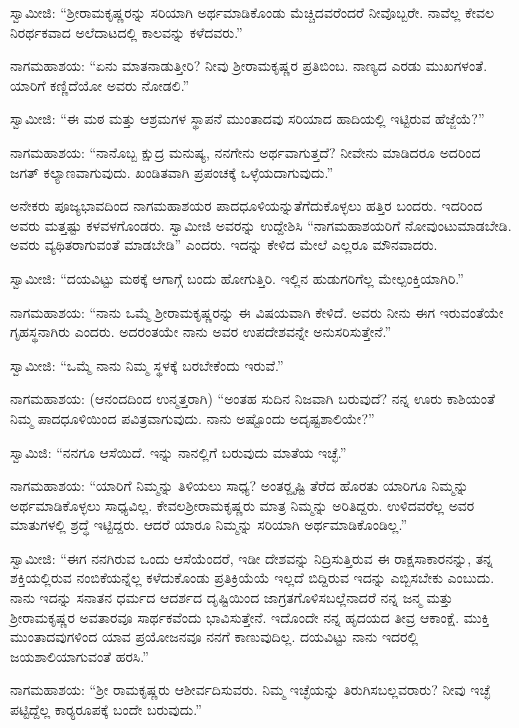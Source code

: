  ಸ್ವಾಮೀಜಿ: “ಶ‍್ರೀರಾಮಕೃಷ್ಣರನ್ನು ಸರಿಯಾಗಿ ಅರ್ಥಮಾಡಿಕೊಂಡು ಮೆಚ್ಚಿದವರೆಂದರೆ ನೀವೊಬ್ಬರೇ. ನಾವೆಲ್ಲ ಕೇವಲ ನಿರರ್ಥಕವಾದ ಅಲೆದಾಟದಲ್ಲಿ ಕಾಲವನ್ನು ಕಳೆದವರು.” 

 ನಾಗಮಹಾಶಯ: “ಏನು ಮಾತನಾಡುತ್ತೀರಿ? ನೀವು ಶ‍್ರೀರಾಮಕೃಷ್ಣರ ಪ್ರತಿಬಿಂಬ. ನಾಣ್ಯದ ಎರಡು ಮುಖಗಳಂತೆ. ಯಾರಿಗೆ ಕಣ್ಣಿದೆಯೋ ಅವರು ನೋಡಲಿ.” 

 ಸ್ವಾಮೀಜಿ: “ಈ ಮಠ ಮತ್ತು ಆಶ್ರಮಗಳ ಸ್ಥಾಪನೆ ಮುಂತಾದವು ಸರಿಯಾದ ಹಾದಿಯಲ್ಲಿ ಇಟ್ಟಿರುವ ಹೆಜ್ಜೆಯೆ?” 

\newpage

 ನಾಗಮಹಾಶಯ: “ನಾನೊಬ್ಬ ಕ್ಷುದ್ರ ಮನುಷ್ಯ, ನನಗೇನು ಅರ್ಥವಾಗುತ್ತದೆ? ನೀವೇನು ಮಾಡಿದರೂ ಅದರಿಂದ ಜಗತ್ ಕಲ್ಯಾಣವಾಗುವುದು. ಖಂಡಿತವಾಗಿ ಪ್ರಪಂಚಕ್ಕೆ ಒಳ್ಳೆಯದಾಗುವುದು.” 

 ಅನೇಕರು ಪೂಜ್ಯಭಾವದಿಂದ ನಾಗಮಹಾಶಯರ ಪಾದಧೂಳಿಯನ್ನು\break ತೆಗೆದುಕೊಳ್ಳಲು ಹತ್ತಿರ ಬಂದರು. ಇದರಿಂದ ಅವರು ಮತ್ತಷ್ಟು ಕಳವಳಗೊಂಡರು. ಸ್ವಾಮೀಜಿ ಅವರನ್ನು ಉದ್ದೇಶಿಸಿ “ನಾಗಮಹಾಶಯರಿಗೆ ನೋವುಂಟುಮಾಡಬೇಡಿ. ಅವರು ವ್ಯಥಿತರಾಗುವಂತೆ ಮಾಡಬೇಡಿ” ಎಂದರು. ಇದನ್ನು ಕೇಳಿದ ಮೇಲೆ ಎಲ್ಲರೂ ಮೌನವಾದರು. 

 ಸ್ವಾಮೀಜಿ: “ದಯವಿಟ್ಟು ಮಠಕ್ಕೆ ಆಗಾಗ್ಗೆ ಬಂದು ಹೋಗುತ್ತಿರಿ. ಇಲ್ಲಿನ ಹುಡುಗರಿಗೆಲ್ಲ ಮೇಲ್ಪಂಕ್ತಿಯಾಗಿರಿ.” 

 ನಾಗಮಹಾಶಯ: “ನಾನು ಒಮ್ಮೆ ಶ‍್ರೀರಾಮಕೃಷ್ಣರನ್ನು ಈ ವಿಷಯವಾಗಿ ಕೇಳಿದೆ. ಅವರು ನೀನು ಈಗ ಇರುವಂತೆಯೇ ಗೃಹಸ್ಥನಾಗಿರು ಎಂದರು. ಅದರಂತಯೇ ನಾನು ಅವರ ಉಪದೇಶವನ್ನೇ ಅನುಸರಿಸುತ್ತೇನೆ.” 

 ಸ್ವಾಮೀಜಿ: “ಒಮ್ಮೆ ನಾನು ನಿಮ್ಮ ಸ್ಥಳಕ್ಕೆ ಬರಬೇಕೆಂದು ಇರುವೆ.” 

 ನಾಗಮಹಾಶಯ: (ಆನಂದದಿಂದ ಉನ್ಮತ್ತರಾಗಿ) “ಅಂತಹ ಸುದಿನ ನಿಜವಾಗಿ ಬರುವುದೆ? ನನ್ನ ಊರು ಕಾಶಿಯಂತೆ ನಿಮ್ಮ ಪಾದಧೂಳಿಯಿಂದ ಪವಿತ್ರವಾಗುವುದು. ನಾನು ಅಷ್ಟೊಂದು ಅದೃಷ್ಟಶಾಲಿಯೇ?” 

 ಸ್ವಾಮಿಜಿ: “ನನಗೂ ಆಸೆಯಿದೆ. ಇನ್ನು ನಾನಲ್ಲಿಗೆ ಬರುವುದು ಮಾತೆಯ ಇಚ್ಛೆ.” 

 ನಾಗಮಹಾಶಯ: “ಯಾರಿಗೆ ನಿಮ್ಮನ್ನು ತಿಳಿಯಲು ಸಾಧ್ಯ? ಅಂತರ್‍ದೃಷ್ಟಿ ತೆರೆದ ಹೊರತು ಯಾರಿಗೂ ನಿಮ್ಮನ್ನು ಅರ್ಥಮಾಡಿಕೊಳ್ಳಲು ಸಾಧ್ಯವಿಲ್ಲ. ಕೇವಲ\break ಶ‍್ರೀರಾಮಕೃಷ್ಣರು ಮಾತ್ರ ನಿಮ್ಮನ್ನು ಅರಿತಿದ್ದರು. ಉಳಿದವರೆಲ್ಲ ಅವರ ಮಾತುಗಳಲ್ಲಿ ಶ್ರದ್ಧೆ ಇಟ್ಟಿದ್ದರು. ಆದರೆ ಯಾರೂ ನಿಮ್ಮನ್ನು ಸರಿಯಾಗಿ ಅರ್ಥಮಾಡಿಕೊಂಡಿಲ್ಲ.” 

 ಸ್ವಾಮೀಜಿ: “ಈಗ ನನಗಿರುವ ಒಂದು ಆಸೆಯೆಂದರೆ, ಇಡೀ ದೇಶವನ್ನು ನಿದ್ರಿಸುತ್ತಿರುವ ಈ ರಾಕ್ಷಸಾಕಾರನನ್ನು, ತನ್ನ ಶಕ್ತಿಯಲ್ಲಿರುವ ನಂಬಿಕೆಯನ್ನೆಲ್ಲ ಕಳೆದುಕೊಂಡು ಪ್ರತಿಕ್ರಿಯೆಯೆ ಇಲ್ಲದೆ ಬಿದ್ದಿರುವ ಇದನ್ನು ಎಬ್ಬಿಸಬೇಕು ಎಂಬುದು. ನಾನು ಇದನ್ನು ಸನಾತನ ಧರ್ಮದ ಆದರ್ಶದ ದೃಷ್ಟಿಯಿಂದ ಜಾಗ್ರತಗೊಳಿಸಬಲ್ಲೆನಾದರೆ ನನ್ನ ಜನ್ಮ ಮತ್ತು ಶ‍್ರೀರಾಮಕೃಷ್ಣರ ಅವತಾರವೂ ಸಾರ್ಥಕವೆಂದು ಭಾವಿಸುತ್ತೇನೆ. ಇದೊಂದೇ ನನ್ನ ಹೃದಯದ ತೀವ್ರ ಆಕಾಂಕ್ಷೆ. ಮುಕ್ತಿ ಮುಂತಾದವುಗಳಿಂದ ಯಾವ ಪ್ರಯೋಜನವೂ ನನಗೆ ಕಾಣುವುದಿಲ್ಲ. ದಯವಿಟ್ಟು ನಾನು ಇದರಲ್ಲಿ ಜಯಶಾಲಿಯಾಗುವಂತೆ ಹರಸಿ.” 

 ನಾಗಮಹಾಶಯ: “ಶ‍್ರೀ ರಾಮಕೃಷ್ಣರು ಆಶೀರ್ವದಿಸುವರು. ನಿಮ್ಮ ಇಚ್ಛೆಯನ್ನು ತಿರುಗಿಸಬಲ್ಲವರಾರು? ನೀವು ಇಚ್ಛೆ ಪಟ್ಟಿದ್ದೆಲ್ಲ ಕಾರ‍್ಯರೂಪಕ್ಕೆ ಬಂದೇ‌ ಬರುವುದು.” 

